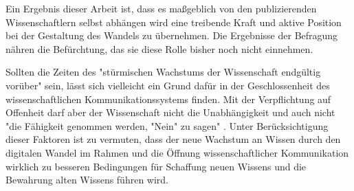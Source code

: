Ein Ergebnis dieser Arbeit ist, dass es maßgeblich von den publizierenden Wissenschaftlern selbst abhängen wird eine treibende Kraft und aktive Position bei der Gestaltung des Wandels zu übernehmen. Die Ergebnisse der Befragung nähren die Befürchtung, das sie diese Rolle bisher noch nicht einnehmen.

Sollten die Zeiten des "stürmischen Wachstums der Wissenschaft endgültig vorüber" \cite{K_lbel_2002} sein, lässt sich vielleicht ein Grund dafür in der Geschlossenheit des wissenschaftlichen Kommunikationssystems finden. Mit der Verpflichtung auf Offenheit darf aber der Wissenschaft nicht die Unabhängigkeit und auch nicht "die Fähigkeit genommen werden, "Nein" zu sagen" \cite{suchen_Hornbostel_2006}. Unter Berücksichtigung dieser Faktoren ist zu vermuten, dass der neue Wachstum an Wissen durch den digitalen Wandel im Rahmen und die Öffnung wissenschaftlicher Kommunikation wirklich zu besseren Bedingungen für Schaffung neuen Wissens und die Bewahrung alten Wissens führen wird.
